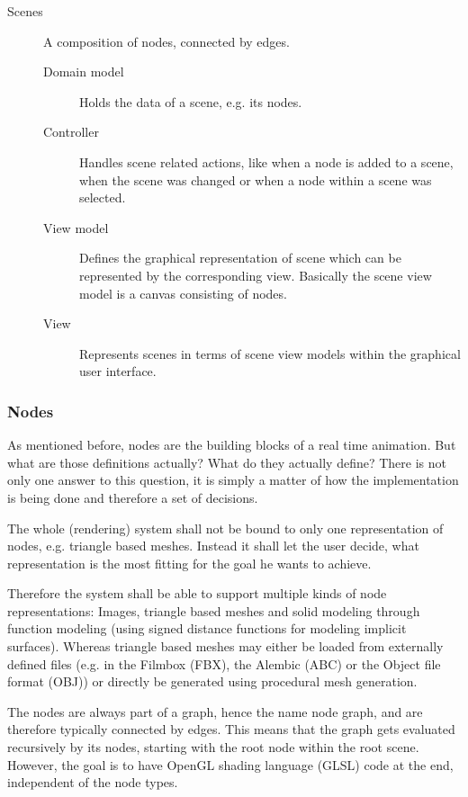 \documentclass[
    a4paper,      %
    10pt,         %
    openright,    %
    notitlepage,  %
    parskip=half, %
]{scrreprt}       %
\theoremstyle{definition}                    %
\begin{document}
\begin{description}
\item[Scenes] A composition of nodes, connected by edges.
  \begin{description}
    \item[Domain model] Holds the data of a scene, e.g. its nodes.
    \item[Controller]   Handles scene related actions, like when a node is added
                        to a scene, when the scene was changed or when a node
                        within a scene was selected.
    \item[View model]   Defines the graphical representation of scene which can
                        be represented by the corresponding view. Basically the
                        scene view model is a canvas consisting of nodes.
    \item[View]         Represents scenes in terms of scene view models within the
                        graphical user interface.
  \end{description}
\end{description}

\subsubsection{Nodes}
\label{ssubsec:nodes}

As mentioned before, nodes are the building blocks of a real time animation. But
what are those definitions actually? What do they actually define? There is not
only one answer to this question, it is simply a matter of how the
implementation is being done and therefore a set of decisions.

The whole (rendering) system shall not be bound to only one representation of
nodes, e.g. triangle based meshes. Instead it shall let the user decide, what
representation is the most fitting for the goal he wants to achieve.

Therefore the system shall be able to support multiple kinds of node
representations: Images, triangle based meshes and solid modeling through
function modeling (using signed distance functions for modeling implicit
surfaces). Whereas triangle based meshes may either be loaded from externally
defined files (e.g. in the Filmbox (FBX), the Alembic (ABC) or the Object file
format (OBJ)) or directly be generated using procedural mesh generation.

The nodes are always part of a graph, hence the name node graph, and are
therefore typically connected by edges. This means that the graph gets evaluated
recursively by its nodes, starting with the root node within the root scene.
However, the goal is to have OpenGL shading language (GLSL) code at the end,
independent of the node types.
\end{document}

